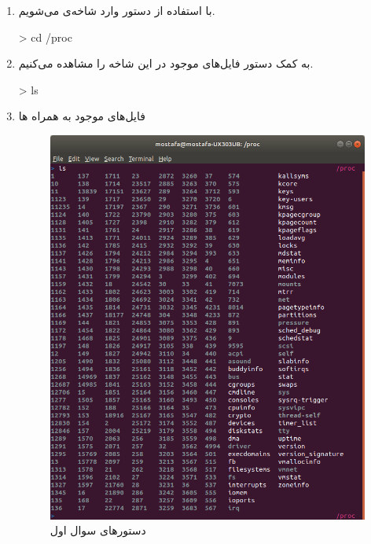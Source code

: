  
 \begin{enumerate}
 	\item با استفاده از دستور   وارد شاخه‌ی  می‌شویم.
 	
 	\begin{code}
 		> cd /proc
 	\end{code}
 
 	\item به کمک دستور  فایل‌های موجود در این شاخه را مشاهده می‌کنیم.
 	
 	\begin{code}
 		> ls
 	\end{code}
 	
 	\item فایل‌های موجود به همراه ها
 	
 		\begin{figure}[!hbpt]
 			\centering
 			\includegraphics[scale=.35]{./img/1.png}
 			\caption{دستورهای سوال اول}
 		\end{figure}
\end{enumerate}

